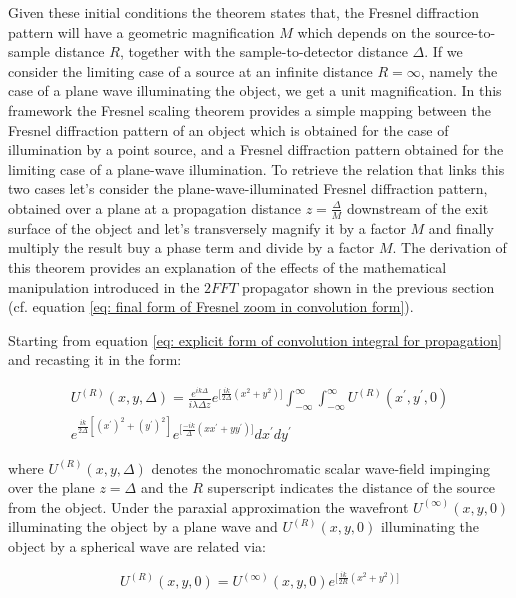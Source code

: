 \documentclass{iucr}              %
\begin{document}
Given these initial conditions the theorem states that, the Fresnel diffraction pattern will have a geometric magnification $M$ which depends on the source-to-sample distance $R$, together with the sample-to-detector distance $\Delta$. If we consider the limiting case of a source at an infinite distance $R=\infty$, namely the case of a plane wave illuminating the object, we get a unit magnification. In this framework the Fresnel scaling theorem provides a simple mapping between the Fresnel diffraction pattern of an object which is obtained for the case of illumination by a point source, and a Fresnel diffraction pattern obtained for the limiting case of a plane-wave illumination. To retrieve the relation that links this two cases let's consider the plane-wave-illuminated Fresnel diffraction pattern, obtained over a plane at a propagation distance $z=\frac{\Delta}{M}$ downstream of the exit surface of the object and let's transversely magnify it by a factor $M$ and finally multiply the result buy a phase term and divide by a factor $M$. The derivation of this theorem provides an explanation of the effects of the mathematical manipulation introduced in the $2FFT$ propagator shown in the previous section (cf. equation \ref{eq: final form of Fresnel zoom in convolution form}).

Starting from equation \ref{eq: explicit form of convolution integral for propagation} and recasting it in the form:

\begin{multline}
U^{(R)}(x, y, \Delta)=\frac {e^{ik\Delta}}{ i \lambda \Delta z} e^{\big[\frac{ik}{2\Delta}(x^2+y^2)\big]} \int_{-\infty}^{\infty} \int_{-\infty}^{\infty}U^{(R)}(x^\prime, y^\prime, 0)\\ e^{ \frac{ik}{2 \Delta} [(x^\prime)^2 + (y^\prime)^2]}e^{\big[\frac{-ik}{\Delta}(xx^{\prime}+yy^{\prime})\big]} dx^\prime dy^\prime
\end{multline}

where $U^{(R)}(x, y, \Delta)$ denotes the monochromatic scalar wave-field impinging over the plane $z=\Delta$ and the $R$ superscript indicates the distance of the source from the object. Under the paraxial approximation the wavefront $U^{(\infty)}(x, y, 0)$ illuminating the object by a plane wave and $U^{(R)}(x, y, 0)$ illuminating the object by a spherical wave are related via:

\begin{equation}\label{eq: spehrical wave vs plane wave}
U^{(R)}(x, y, 0)=U^{(\infty)}(x, y, 0)e^{\big[\frac{ik}{2R}(x^2+y^2)\big]}
\end{equation}
 
\end{document}
